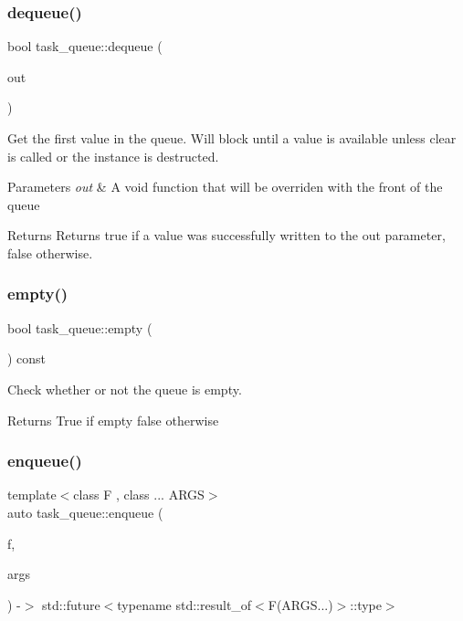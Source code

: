 \subsubsection{\texorpdfstring{dequeue()}{dequeue()}}
{\footnotesize\ttfamily bool task\+\_\+queue\+::dequeue (\begin{DoxyParamCaption}\item[{function\+\_\+t \&}]{out }\end{DoxyParamCaption})\hspace{0.3cm}{\ttfamily [inline]}}

Get the first value in the queue. Will block until a value is available unless clear is called or the instance is destructed. 
\begin{DoxyParams}{Parameters}
{\em out} & A void function that will be overriden with the front of the queue \\
\hline
\end{DoxyParams}
\begin{DoxyReturn}{Returns}
Returns true if a value was successfully written to the out parameter, false otherwise. 
\end{DoxyReturn}
\mbox{\label{classtask__queue_a124dd18ea98e42ae705f7835fd0c69cf}} 
\subsubsection{\texorpdfstring{empty()}{empty()}}
{\footnotesize\ttfamily bool task\+\_\+queue\+::empty (\begin{DoxyParamCaption}{ }\end{DoxyParamCaption}) const\hspace{0.3cm}{\ttfamily [inline]}}

Check whether or not the queue is empty. \begin{DoxyReturn}{Returns}
True if empty false otherwise 
\end{DoxyReturn}
\mbox{\label{classtask__queue_ac9fce851e5f4eecd014ef0130f0db4bc}} 
\subsubsection{\texorpdfstring{enqueue()}{enqueue()}}
{\footnotesize\ttfamily template$<$class F , class ... A\+R\+GS$>$ \\
auto task\+\_\+queue\+::enqueue (\begin{DoxyParamCaption}\item[{F \&\&}]{f,  }\item[{A\+R\+GS \&\&...}]{args }\end{DoxyParamCaption}) -\/$>$ std\+::future$<$typename std\+::result\+\_\+of$<$F(A\+R\+G\+S...)$>$\+::type$>$ \hspace{0.3cm}{\ttfamily [inline]}}

